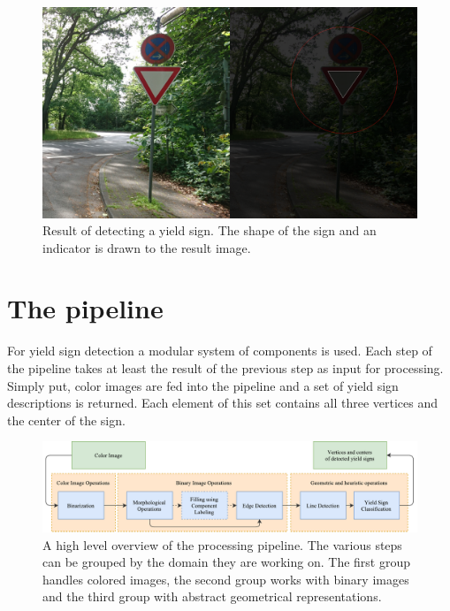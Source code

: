 \documentclass{report}
\begin{document}
\begin{figure}
  \centering
    \includegraphics[width=1\textwidth]{src/result}
  \caption{Result of detecting a yield sign. The shape of the sign
    and an indicator is drawn to the result image.}
  \label{img:result}
\end{figure}


\pagebreak
\chapter{The pipeline}
\label{chap:pipeline}

For yield sign detection a modular system of components is used. Each
step of the pipeline takes at least the result of the previous step as
input for processing. Simply put, color images are fed into the
pipeline and a set of yield sign descriptions is returned. Each
element of this set contains all three vertices and the center of the
sign.

\begin{figure}
  \centering
    \includegraphics[width=1\textwidth]{src/pipeline}
  \caption{A high level overview of the processing pipeline. The
    various steps can be grouped by the domain they are working
    on. The first group handles colored images, the second group works
    with binary images and the third group with abstract geometrical
    representations.}
  \label{img:pipeline}
\end{figure}
\end{document}
